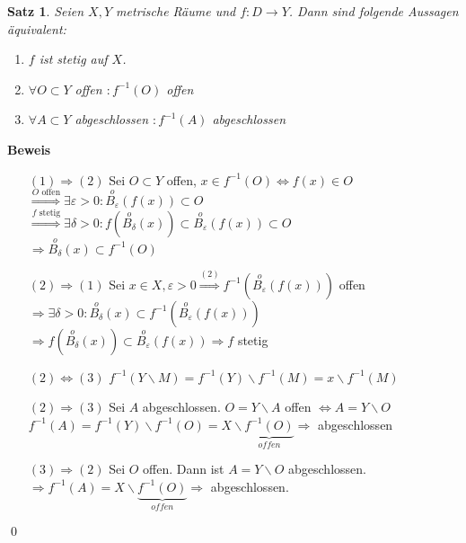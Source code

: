 \documentclass[ngerman,titlepage,twoside, parskip=half*]{scrreprt}
\theoremstyle{plain}
\newtheorem{theorem}{Satz}[section]
\theoremstyle{definition}
\theoremstyle{remark}
\begin{document}
\begin{theorem}
\label{satz:fkt-aquiv}
Seien $X,Y$ metrische Räume und $f\colon D\rightarrow Y$. Dann sind folgende Aussagen äquivalent:
\begin{enumerate}[(1)]
  \item $f$ ist stetig auf $X$.
  \item $\forall O \subset Y$ offen $\colon f^{-1}(O)$ offen
  \item $\forall A \subset Y$ abgeschlossen $\colon f^{-1}(A)$ abgeschlossen
\end{enumerate}
\end{theorem}
\textbf{Beweis}
\begin{itemize}
  \item[$(1)\Rightarrow (2)$] Sei $O\subset Y$ offen, $x\in f^{-1}(O)\Leftrightarrow f(x)\in O$\\
    $\stackrel{O \text{ offen}}{\Longrightarrow} \exists \varepsilon >0\colon\stackrel{o}{B_{\varepsilon}}
    (f(x))\subset O$\\
    $\stackrel{f \text{ stetig}}{\Longrightarrow} \exists \delta >0\colon f(\stackrel{o}{B_{\delta}}(x))\subset
    \stackrel{o}{B_{\varepsilon}}(f(x))\subset O$\\
    $\Longrightarrow \stackrel{o}{B_{\delta}}(x)\subset f^{-1}(O)$
  \item[$(2)\Rightarrow (1)$] Sei $x\in X, \varepsilon
    >0\stackrel{(2)}{\Rightarrow} f^{-1}(\stackrel{o}
    {B_{\varepsilon}}(f(x)))$ offen\\
    $\Rightarrow \exists \delta >0\colon\stackrel{o}{B_{\delta}}(x)\subset
    f^{-1}(\stackrel{o}
    {B_{\varepsilon}}(f(x)))$\\
    $\Rightarrow f(\stackrel{o}{B_{\delta}}(x))\subset
    \stackrel{o}{B_{\varepsilon}} (f(x)) \Rightarrow f$ stetig
  \item[$(2)\Leftrightarrow (3)$] $f^{-1}(Y\backslash M)=f^{-1}(Y)\backslash f^{-1}(M)=x\backslash f^{-1}(M)$
  \item[$(2)\Rightarrow (3)$] Sei $A$ abgeschlossen. $O=Y\backslash A$ offen $\Leftrightarrow A=Y
    \backslash O$\\
    $f^{-1}(A)=f^{-1}(Y)\backslash f^{-1}(O)=X\backslash \underbrace{f^{-1}(O)}_{offen} \Rightarrow$
    abgeschlossen
  \item[$(3)\Rightarrow (2)$] Sei $O$ offen. Dann ist $A=Y\backslash O$ abgeschlossen. $\Rightarrow f^{-1}
    (A)=X\backslash \underbrace{f^{-1}(O)}_{offen} \Rightarrow$ abgeschlossen.
\end{itemize}
\qed
\end{document}
